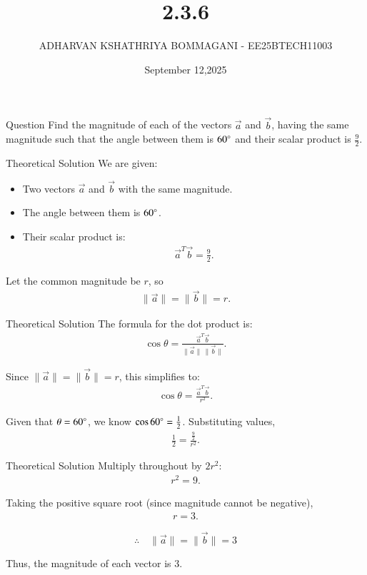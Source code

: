 \documentclass{beamer}
\title 
{2.3.6}
\date{September 12,2025}
\author 
{ADHARVAN KSHATHRIYA BOMMAGANI - EE25BTECH11003}
\begin{document}
\frame{\titlepage}

\begin{frame}{Question}
Find the magnitude of each of the vectors $\vec{a}$ and $\vec{b}$, having the same magnitude such that the angle between them is $60\degree$ and their scalar product is $\frac{9}{2}$.
\end{frame}

\begin{frame}{Theoretical Solution}
We are given:
\begin{itemize}
    \item Two vectors $\vec{a}$ and $\vec{b}$ with the same magnitude.
    \item The angle between them is $60\degree$.
    \item Their scalar product is:
    \begin{align}
        \vec{a}^T \vec{b} = \frac{9}{2}.
    \end{align}
\end{itemize}

Let the common magnitude be $r$, so
\begin{align}
    \|\vec{a}\| = \|\vec{b}\| = r.
\end{align}
\end{frame}

\begin{frame}{Theoretical Solution}
The formula for the dot product is:
\begin{align}
\cos\theta = \frac{\vec{a}^T \vec{b}}{\|\vec{a}\|\,\|\vec{b}\|}.
\end{align}

Since $\|\vec{a}\| = \|\vec{b}\| = r$, this simplifies to:
\begin{align}
\cos\theta = \frac{\vec{a}^T \vec{b}}{r^2}.
\end{align}

Given that $\theta = 60\degree$, we know $\cos 60\degree = \frac{1}{2}$.
Substituting values,
\begin{align}
\frac{1}{2} = \frac{\frac{9}{2}}{r^2}.
\end{align}
\end{frame}

\begin{frame}{Theoretical Solution}
Multiply throughout by $2r^2$:
\begin{align}
r^2 = 9.
\end{align}

Taking the positive square root (since magnitude cannot be negative),
\begin{align}
r = 3.
\end{align}

\[
\therefore \quad \|\vec{a}\| = \|\vec{b}\| = 3
\]

Thus, the magnitude of each vector is 3.
\end{frame}
\end{document}

